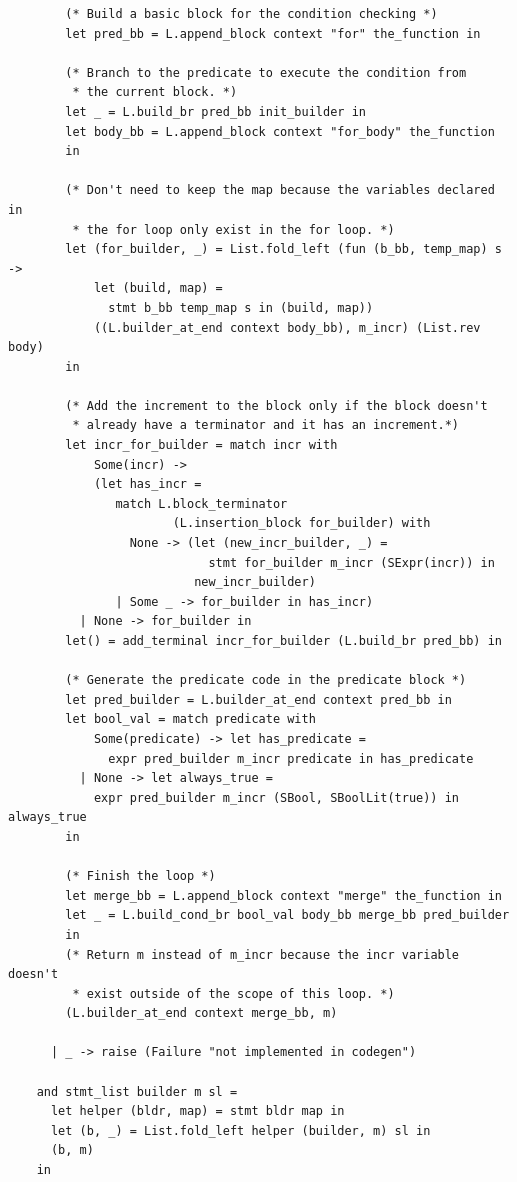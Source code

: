 \documentclass[12pt]{article}
\begin{document}
\begin{mdframed}[hidealllines=true,backgroundcolor=blue!20]
\begin{lstlisting}
        (* Build a basic block for the condition checking *)
        let pred_bb = L.append_block context "for" the_function in

        (* Branch to the predicate to execute the condition from
         * the current block. *)
        let _ = L.build_br pred_bb init_builder in
        let body_bb = L.append_block context "for_body" the_function
        in

        (* Don't need to keep the map because the variables declared in
         * the for loop only exist in the for loop. *)   
        let (for_builder, _) = List.fold_left (fun (b_bb, temp_map) s -> 
            let (build, map) = 
              stmt b_bb temp_map s in (build, map)) 
            ((L.builder_at_end context body_bb), m_incr) (List.rev body)
        in

        (* Add the increment to the block only if the block doesn't
         * already have a terminator and it has an increment.*)
        let incr_for_builder = match incr with
            Some(incr) ->
            (let has_incr = 
               match L.block_terminator 
                       (L.insertion_block for_builder) with
                 None -> (let (new_incr_builder, _) = 
                            stmt for_builder m_incr (SExpr(incr)) in
                          new_incr_builder)
               | Some _ -> for_builder in has_incr)
          | None -> for_builder in
        let() = add_terminal incr_for_builder (L.build_br pred_bb) in

        (* Generate the predicate code in the predicate block *)
        let pred_builder = L.builder_at_end context pred_bb in
        let bool_val = match predicate with 
            Some(predicate) -> let has_predicate = 
              expr pred_builder m_incr predicate in has_predicate
          | None -> let always_true = 
            expr pred_builder m_incr (SBool, SBoolLit(true)) in always_true
        in

        (* Finish the loop *)
        let merge_bb = L.append_block context "merge" the_function in
        let _ = L.build_cond_br bool_val body_bb merge_bb pred_builder
        in
        (* Return m instead of m_incr because the incr variable doesn't
         * exist outside of the scope of this loop. *)
        (L.builder_at_end context merge_bb, m)

      | _ -> raise (Failure "not implemented in codegen")

    and stmt_list builder m sl =
      let helper (bldr, map) = stmt bldr map in
      let (b, _) = List.fold_left helper (builder, m) sl in
      (b, m)
    in


\end{lstlisting}
\end{mdframed}
\end{document}
